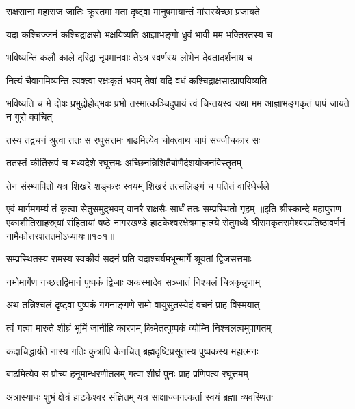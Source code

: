 \twolineshloka
{राक्षसानां महाराज जातिः क्रूरतमा मता}
{दृष्ट्वा मानुषमायान्तं मांसस्येच्छा प्रजायते}%

\twolineshloka
{यदा कश्चिज्जनं कश्चिद्राक्षसो भक्षयिष्यति}
{आज्ञाभङ्गो ध्रुवं भावी मम भक्तिरतस्य च}%

\twolineshloka
{भविष्यन्ति कलौ काले दरिद्रा नृपमानवाः}
{तेऽत्र स्वर्णस्य लोभेन देवतादर्शनाय च}%

\twolineshloka
{नित्यं चैवागमिष्यन्ति त्यक्त्वा रक्षःकृतं भयम्}
{तेषां यदि वधं कश्चिद्राक्षसात्प्रापयिष्यति}%

\threelineshloka
{भविष्यति च मे दोषः प्रभुद्रोहोद्भवः प्रभो}
{तस्मात्कञ्चिदुपायं त्वं चिन्तयस्व यथा मम}
{आज्ञाभङ्गकृतं पापं जायते न गुरो क्वचित्}%

\twolineshloka
{तस्य तद्वचनं श्रुत्वा ततः स रघुसत्तमः}
{बाढमित्येव चोक्त्वाथ चापं सज्जीचकार सः}%

\twolineshloka
{ततस्तं कीर्तिरूपं च मध्यदेशे रघूत्तमः}
{अच्छिनन्निशितैर्बाणैर्दशयोजनविस्तृतम्}%

\twolineshloka
{तेन संस्थापितो यत्र शिखरे शङ्करः स्वयम्}
{शिखरं तत्सलिङ्गं च पतितं वारिधेर्जले}%

\twolineshloka
{एवं मार्गमगम्यं तं कृत्वा सेतुसमुद्भवम्}
{वानरै राक्षसैः सार्धं ततः सम्प्रस्थितो गृहम्}%
॥इति श्रीस्कान्दे महापुराण एकाशीतिसाहस्र्यां संहितायां षष्ठे नागरखण्डे हाटकेश्वरक्षेत्रमाहात्म्ये सेतुमध्ये श्रीरामकृतरामेश्वरप्रतिष्ठावर्णनं नामैकोत्तरशततमोऽध्यायः॥१०१॥


\twolineshloka
{सम्प्रस्थितस्य रामस्य स्वकीयं सदनं प्रति}
{यदाश्चर्यमभून्मार्गे श्रूयतां द्विजसत्तमाः}%

\twolineshloka
{नभोमार्गेण गच्छत्तद्विमानं पुष्पकं द्विजाः}
{अकस्मादेव सञ्जातं निश्चलं चित्रकृन्नृणाम्}%

\twolineshloka
{अथ तन्निश्चलं दृष्ट्वा पुष्पकं गगनाङ्गणे}
{रामो वायुसुतस्येदं वचनं प्राह विस्मयात्}%

\twolineshloka
{त्वं गत्वा मारुते शीघ्रं भूमिं जानीहि कारणम्}
{किमेतत्पुष्पकं व्योम्नि निश्चलत्वमुपागतम्}%

\twolineshloka
{कदाचिद्धार्यते नास्य गतिः कुत्रापि केनचित्}
{ब्रह्मदृष्टिप्रसूतस्य पुष्पकस्य महात्मनः}%

\twolineshloka
{बाढमित्येव स प्रोच्य हनूमान्धरणीतलम्}
{गत्वा शीघ्रं पुनः प्राह प्रणिपत्य रघूत्तमम्}%

\twolineshloka
{अत्रास्याधः शुभं क्षेत्रं हाटकेश्वर संज्ञितम्}
{यत्र साक्षाज्जगत्कर्ता स्वयं ब्रह्मा व्यवस्थितः}%

